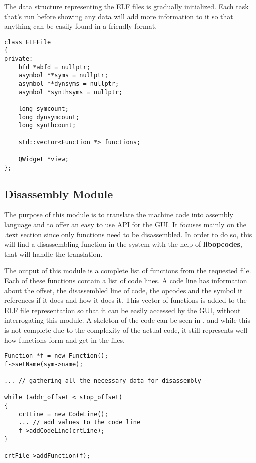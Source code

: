The data structure representing the ELF files is gradually initialized. Each task that's run before showing any data will add more information to it so that anything can be easily found in a friendly format.

\bigbreak
\lstset{language=c++,caption=The data cached in the ELFFile class,label=lst:elf-code}
\begin{lstlisting}
class ELFFile
{
private:
	bfd *abfd = nullptr;
	asymbol **syms = nullptr;
	asymbol **dynsyms = nullptr;
	asymbol *synthsyms = nullptr;
	
	long symcount;
	long dynsymcount;
	long synthcount;
	
	std::vector<Function *> functions;
	
	QWidget *view;
};
\end{lstlisting}

\subsection{Disassembly Module}
\label{sub-sec:dis-mod}

The purpose of this module is to translate the machine code into assembly language and to offer an easy to use API for the GUI. It focuses mainly on the .text section since only functions need to be disassembled. In order to do so, this will find a disassembling function in the system with the help of \textbf{libopcodes}, that will handle the translation.

The output of this module is a complete list of functions from the requested file. Each of these functions contain a list of code lines. A code line has information about the offset, the disassembled line of code, the opcodes and the symbol it references if it does and how it does it. This vector of functions is added to the ELF file representation so that it can be easily accessed by the GUI, without interrogating this module. A skeleton of the code can be seen in , and while this is not complete due to the complexity of the actual code, it still represents well how functions form and get in the files.

\bigbreak
\lstset{language=c++,caption=Disassembly skeleton,label=lst:dis-code}
\begin{lstlisting}
Function *f = new Function();
f->setName(sym->name);

... // gathering all the necessary data for disassembly

while (addr_offset < stop_offset)
{
	crtLine = new CodeLine();
	... // add values to the code line
	f->addCodeLine(crtLine);
}

crtFile->addFunction(f);
\end{lstlisting}

